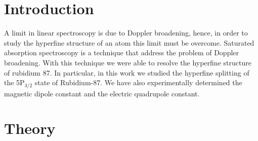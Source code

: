 \documentclass[a4paper,10pt]{article}
\begin{document}
\section{Introduction}
A limit in linear spectroscopy is due to Doppler broadening, hence, in order to study the hyperfine structure of an atom this limit must be overcome. Saturated absorption spectroscopy is a technique that address the problem of Doppler broadening. With this technique we were able to resolve the hyperfine structure of rubidium 87. In particular, in this work we studied the hyperfine splitting of the 5P$_{3/2}$ state of Rubidium-87. We have also experimentally determined the magnetic dipole constant and the electric quadrupole constant.
\section{Theory}
\end{document}
